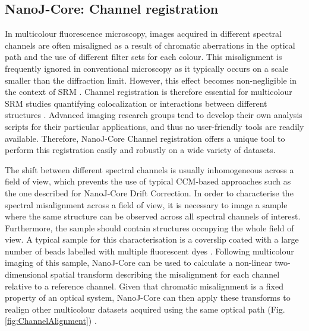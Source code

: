 \subsection*{NanoJ-Core: Channel registration}
 In multicolour fluorescence microscopy, images acquired in different spectral channels are often misaligned as a result of chromatic aberrations in the optical path and the use of different filter sets for each colour. This misalignment is frequently ignored in conventional microscopy as it typically occurs on a scale smaller than the diffraction limit. However, this effect becomes non-negligible in the context of SRM \cite{erdelyi2013correcting}. Channel registration is therefore essential for multicolour SRM studies quantifying colocalization or interactions between different structures \cite{bock2007two,van2009multicolor,niekamp2017high}. Advanced imaging research groups tend to develop their own analysis scripts for their particular applications, and thus no user-friendly tools are readily available. Therefore, NanoJ-Core Channel registration offers a unique tool to perform this registration easily and robustly on a wide variety of datasets.
 
 The shift between different spectral channels is usually inhomogeneous across a field of view, which prevents the use of typical CCM-based approaches such as the one described for NanoJ-Core Drift Correction. In order to characterise the spectral misalignment across a field of view, it is necessary to image a sample where the same structure can be observed across all spectral channels of interest. Furthermore, the sample should contain structures occupying the whole field of view. A typical sample for this characterisation is a coverslip coated with a large number of beads labelled with multiple fluorescent dyes \cite{demmerle2017strategic}. Following multicolour imaging of this sample, NanoJ-Core can be used to calculate a non-linear two-dimensional spatial transform describing the misalignment for each channel relative to a reference channel. Given that chromatic misalignment is a fixed property of an optical system, NanoJ-Core can then apply these transforms to realign other multicolour datasets acquired using the same optical path (Fig. \ref{fig:ChannelAlignment}) \cite{arganda2006consistent,annibale2012identification}.
 
